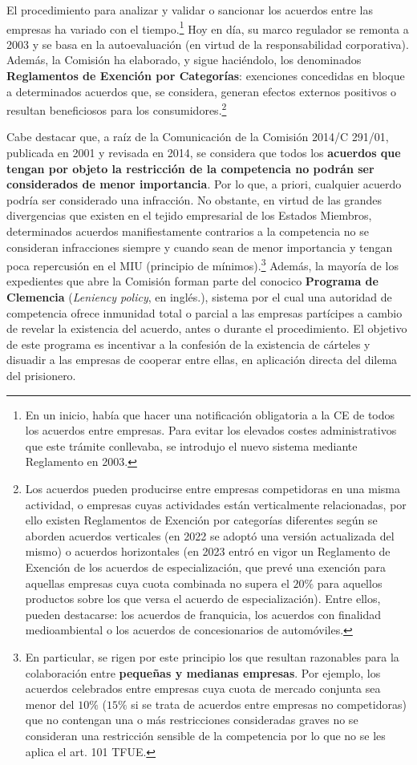 \documentclass[10pt,a4paper]{article}
\begin{document}
El procedimiento para analizar y validar o sancionar los acuerdos entre las empresas ha variado con el tiempo.\footnote{%
    En un inicio, había que hacer una notificación obligatoria a la CE de todos los acuerdos entre empresas. Para evitar los elevados costes administrativos que este trámite conllevaba, se introdujo el nuevo sistema mediante Reglamento en 2003.
} Hoy en día, su marco regulador se remonta a 2003 y se basa en la autoevaluación (en virtud de la responsabilidad corporativa). Además, la Comisión ha elaborado, y sigue haciéndolo, los denominados \textbf{Reglamentos de Exención por Categorías}: exenciones concedidas en bloque a determinados acuerdos que, se considera, generan efectos externos positivos o resultan beneficiosos para los consumidores.\footnote{%
    Los acuerdos pueden producirse entre empresas competidoras en una misma actividad, o empresas cuyas actividades están verticalmente relacionadas, por ello existen Reglamentos de Exención por categorías diferentes según se aborden acuerdos verticales (en 2022 se adoptó una versión actualizada del mismo) o acuerdos horizontales (en 2023 entró en vigor un Reglamento de Exención de los acuerdos de especialización, que prevé una exención para aquellas empresas cuya cuota combinada no supera el $20\%$ para aquellos productos sobre los que versa el acuerdo de especialización). Entre ellos, pueden destacarse: los acuerdos de franquicia, los acuerdos con finalidad medioambiental o los acuerdos de concesionarios de automóviles.
}

Cabe destacar que, a raíz de la Comunicación de la Comisión 2014/C 291/01, publicada en 2001 y revisada en 2014, se considera que todos los \textbf{acuerdos que tengan por objeto la restricción de la competencia no podrán ser considerados de menor importancia}. Por lo que, a priori, cualquier acuerdo podría ser considerado una infracción. No obstante, en virtud de las grandes divergencias que existen en el tejido empresarial de los Estados Miembros, determinados acuerdos manifiestamente contrarios a la competencia no se consideran infracciones siempre y cuando sean de menor importancia y tengan poca repercusión en el MIU (principio de mínimos).\footnote{%
    En particular, se rigen por este principio los que resultan razonables para la colaboración entre \textbf{pequeñas y medianas empresas}. Por ejemplo, los acuerdos celebrados entre empresas cuya cuota de mercado conjunta sea menor del $10\%$ ($15\%$ si se trata de acuerdos entre empresas no competidoras) que no contengan una o más restricciones consideradas graves no se consideran una restricción sensible de la competencia por lo que no se les aplica el art. 101 TFUE.
} Además, la mayoría de los expedientes que abre la Comisión forman parte del conocico \textbf{Programa de Clemencia} (\textit{Leniency policy}, en inglés.), sistema por el cual una autoridad de competencia ofrece inmunidad total o parcial a las empresas partícipes a cambio de revelar la existencia del acuerdo, antes o durante el procedimiento. El objetivo de este programa es incentivar a la confesión de la existencia de cárteles y disuadir a las empresas de cooperar entre ellas, en aplicación directa del dilema del prisionero.
\end{document}
